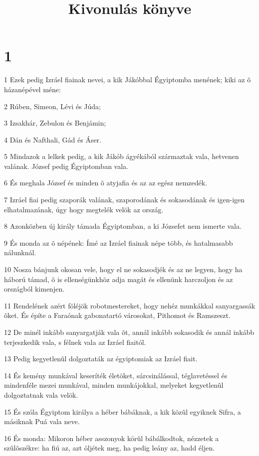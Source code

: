 

\title{Kivonulás könyve}


\chapter{1}

\par 1 Ezek pedig Izráel fiainak nevei, a kik Jákóbbal Égyiptomba menének; kiki az õ házanépével méne:
\par 2 Rúben, Simeon, Lévi és Júda;
\par 3 Izsakhár, Zebulon és Benjámin;
\par 4 Dán és Nafthali, Gád és Áser.
\par 5 Mindazok a lelkek pedig, a kik Jákób ágyékából származtak vala, hetvenen valának. József pedig Égyiptomban vala.
\par 6 És meghala József és minden õ atyjafia és az az egész nemzedék.
\par 7 Izráel fiai pedig szaporák valának, szaporodának és sokasodának és igen-igen elhatalmazának, úgy hogy megtelék velök az ország.
\par 8 Azonközben új király támada Égyiptomban, a ki Józsefet nem ismerte vala.
\par 9 És monda az õ népének: Ímé az Izráel fiainak népe több, és hatalmasabb nálunknál.
\par 10 Nosza bánjunk okosan vele, hogy el ne sokasodjék és az ne legyen, hogy ha háború támad, õ is ellenségünkhöz adja magát és ellenünk harczoljon és az országból kimenjen.
\par 11 Rendelének azért föléjök robotmestereket, hogy nehéz munkákkal sanyargassák õket. És építe a Faraónak gabonatartó városokat, Pithomot és Ramszeszt.
\par 12 De minél inkább sanyargatják vala õt, annál inkább sokasodik és annál inkább terjeszkedik vala, s félnek vala az Izráel fiaitól.
\par 13 Pedig kegyetlenûl dolgoztaták az égyiptomiak az Izráel fiait.
\par 14 És kemény munkával keseríték életöket, sárcsinálással, téglavetéssel és mindenféle mezei munkával, minden munkájokkal, melyeket kegyetlenûl dolgoztatnak vala velök.
\par 15 És szóla Égyiptom királya a héber bábáknak, a kik közûl egyiknek Sifra, a másiknak Puá vala neve.
\par 16 És monda: Mikoron héber asszonyok körûl bábálkodtok, nézzetek a szûlõszékre: ha fiú az, azt öljétek meg, ha pedig leány az, hadd éljen.
